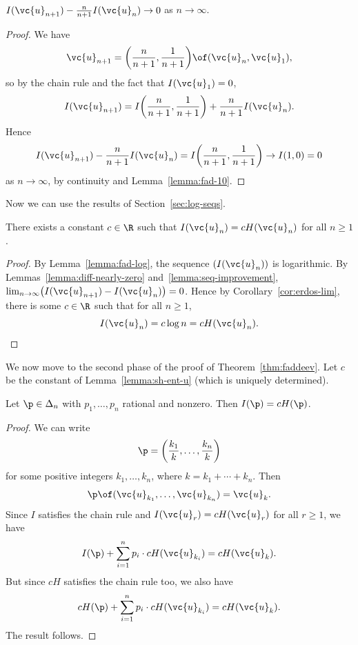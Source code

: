 \begin{lemma}
$I(\vc{u}_{n + 1}) - \tfrac{n}{n + 1} I(\vc{u}_n) \to 0$ as $n \to \infty$.
\end{lemma}

\begin{proof}
We have
\[
\vc{u}_{n + 1} 
=
\biggl( \frac{n}{n + 1}, \frac{1}{n + 1} \biggr) \of (\vc{u}_n, \vc{u}_1),
\]
so by the chain rule and the fact that $I(\vc{u}_1) = 0$,
\[
I(\vc{u}_{n + 1})
=
I\biggl( \frac{n}{n + 1}, \frac{1}{n + 1} \biggr)
+
\frac{n}{n + 1} I(\vc{u}_n).
\]
Hence
\[
I(\vc{u}_{n + 1}) - \frac{n}{n + 1} I(\vc{u}_n)
=
I\biggl( \frac{n}{n + 1}, \frac{1}{n + 1} \biggr)
\to 
I(1, 0)
=
0
\]
as $n \to \infty$, by continuity and Lemma~\ref{lemma:fad-10}.
\end{proof}

Now we can use the results of Section~\ref{sec:log-seqs}.

\begin{lemma}
There exists a constant $c \in \R$ such that $I(\vc{u}_n) = cH(\vc{u}_n)$
for all $n \geq 1$.
\end{lemma}

\begin{proof}
By Lemma~\ref{lemma:fad-log}, the sequence
$(I(\vc{u}_n))$ is logarithmic.  By Lemmas~\ref{lemma:diff-nearly-zero}
and~\ref{lemma:seq-improvement}, $\lim_{n \to \infty} \bigl( I(\vc{u}_{n +
  1}) - I(\vc{u}_n)\bigr) = 0$.  Hence by Corollary~\ref{cor:erdos-lim},
there is some $c \in \R$ such that for all $n \geq 1$,
\[
I(\vc{u}_n) 
=
c \log n
=
c H(\vc{u}_n).
\]
\end{proof}

We now move to the second phase of the proof of Theorem~\ref{thm:faddeev}.
Let $c$ be the constant of Lemma~\ref{lemma:sh-ent-u} (which is uniquely
determined).  

\begin{lemma}
Let $\p \in \Delta_n$ with $p_1, \ldots, p_n$ rational and nonzero.  Then
$I(\p) = cH(\p)$. 
\end{lemma}

\begin{proof}
We can write 
\[
\p = \biggl( \frac{k_1}{k}, \ldots, \frac{k_n}{k} \biggr)
\]
for some positive integers $k_1, \ldots, k_n$, where $k = k_1 + \cdots +
k_n$.  Then
\[
\p \of (\vc{u}_{k_1}, \ldots, \vc{u}_{k_n}) = \vc{u}_k.
\]
Since $I$ satisfies the chain rule and $I(\vc{u}_r) = cH(\vc{u}_r)$ for
all $r \geq 1$, we have
\[
I(\p) + \sum_{i = 1}^n p_i \cdot cH(\vc{u}_{k_i}) = cH(\vc{u}_k).
\]
But since $cH$ satisfies the chain rule too, we also have
\[
cH(\p) + \sum_{i = 1}^n p_i \cdot cH(\vc{u}_{k_i}) = cH(\vc{u}_k).
\]
The result follows.
\end{proof}

